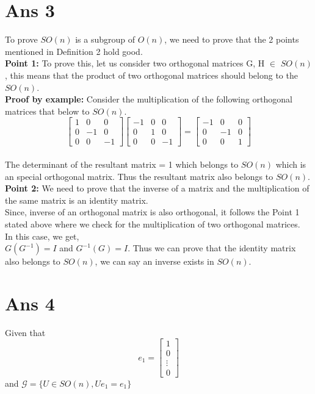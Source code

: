 \documentclass[10pt]{article}
\begin{document}
\section*{Ans 3}
\begin{flushleft}
To prove $SO(n)$ is a subgroup of $O(n)$, we need to prove that the 2 points mentioned in Definition 2 hold good.\\
\vspace{0.5em}
\textbf{Point 1:} To prove this, let us consider two orthogonal matrices G, H $\in$ $SO(n)$, this means that the product of two orthogonal matrices should belong to the $SO(n)$.\\
\vspace{0.5em}
\textbf{Proof by example:} Consider the multiplication of the following orthogonal matrices that below to $SO(n)$. \\
$$
\begin{bmatrix} 
1 & 0 & 0 \\
0 & -1 & 0 \\
0 & 0 & -1 
\end{bmatrix} 
\begin{bmatrix} 
-1 & 0 & 0 \\
0 & 1 & 0 \\
0 & 0 & -1 
\end{bmatrix} 
= 
\begin{bmatrix} 
-1 & 0 & 0 \\
0 & -1 & 0 \\
0 & 0 & 1 
\end{bmatrix} 
$$
\\
The determinant of the resultant matrix  = 1 which belongs to $SO(n)$ which is an special orthogonal matrix. Thus the resultant matrix also belongs to $SO(n)$.\\
\vspace{0.5em}
\textbf{Point 2: } We need to prove that the inverse of a matrix and the multiplication of the same matrix is an identity matrix. \\
\vspace{0.5em}
Since, inverse of an orthogonal matrix is also orthogonal, it follows the Point 1 stated above where we check for the multiplication of two orthogonal matrices. \\
In this case, we get,\\
$G (G^{-1}) = I$ and $G^{-1} (G) = I$. Thus we can prove that the identity matrix also belongs to $SO(n)$, we can say an inverse exists in $SO(n)$.
\end{flushleft}
\section*{Ans 4}
\begin{flushleft}
Given that $$
e_{1} = 
\begin{bmatrix} 
1 \\
0 \\
\vdots \\
0 
\end{bmatrix} 
$$
and $\mathcal{G} = \{U \in SO(n), U e_{1} = e_{1}\}$\\

\end{flushleft}
\end{document}
